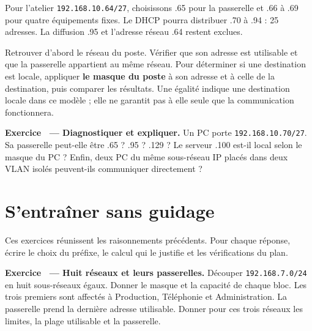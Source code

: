 \documentclass[11pt,a4paper]{article}
\newif\ifcorrige
\newcommand{\ip}[1]{\textcolor{ipred}{\texttt{#1}}}
\newcounter{exo}
\newcommand{\exo}[2]{%
  \Needspace{6cm}\stepcounter{exo}\begin{quest}\textbf{Exercice \theexo\ — #1.} #2\end{quest}}
\newcommand{\zone}[2]{%
  \ifcorrige
    \begin{tcolorbox}[colback=corrbg,colframe=corr,boxrule=0.6pt,arc=1pt,left=5pt,right=5pt,
      fontupper=\small\color{corr}]#2\end{tcolorbox}%
  \else
    \begin{tcolorbox}[colback=white,colframe=black!45,boxrule=0.5pt,arc=1pt,height=#1]\end{tcolorbox}%
  \fi}
\begin{document}
Pour l'atelier \ip{192.168.10.64/27}, choisissons .65 pour la passerelle et .66 à .69 pour quatre
équipements fixes. Le DHCP pourra distribuer .70 à .94 : 25 adresses.
La diffusion .95 et l'adresse réseau .64 restent exclues.

\begin{methode}
Retrouver d'abord le réseau du poste. Vérifier que son adresse est utilisable et que la passerelle
appartient au même réseau. Pour déterminer si une destination est locale, appliquer
\textbf{le masque du poste} à son adresse et à celle de la destination, puis comparer les résultats.
Une égalité indique une destination locale dans ce modèle ; elle ne garantit pas à elle seule
que la communication fonctionnera.
\end{methode}

\exo{Diagnostiquer et expliquer}{Un PC porte \ip{192.168.10.70/27}.
Sa passerelle peut-elle être .65 ? .95 ? .129 ?
Le serveur .100 est-il local selon le masque du PC ?
Enfin, deux PC du même sous-réseau IP placés dans deux VLAN isolés peuvent-ils communiquer directement ?}
\zone{2.8cm}{Le PC appartient à \ip{192.168.10.64/27}, utilisables .65 à .94.
.65 convient si elle est attribuée au routeur ; .95 est la diffusion ; .129 est hors du sous-réseau.
.100 appartient à .96/27 : destination distante pour ce PC.
Deux VLAN isolés ne fournissent pas la connectivité de couche 2 nécessaire, même si les adresses
ont été configurées dans un même sous-réseau IP.}

\Needspace{6cm}
\section{S'entraîner sans guidage}
Ces exercices réunissent les raisonnements précédents. Pour chaque réponse, écrire le choix du préfixe,
le calcul qui le justifie et les vérifications du plan.

\exo{Huit réseaux et leurs passerelles}{Découper \ip{192.168.7.0/24} en huit sous-réseaux égaux.
Donner le masque et la capacité de chaque bloc. Les trois premiers sont affectés à Production,
Téléphonie et Administration. La passerelle prend la dernière adresse utilisable.
Donner pour ces trois réseaux les limites, la plage utilisable et la passerelle.}
\zone{3.2cm}{3 bits supplémentaires donnent 8 réseaux /27, masque \ip{255.255.255.224}, 30 utilisables chacun.
Production : .0/27, utilisables .1 à .30, diffusion .31, passerelle .30.
Téléphonie : .32/27, utilisables .33 à .62, diffusion .63, passerelle .62.
Administration : .64/27, utilisables .65 à .94, diffusion .95, passerelle .94.
Les cinq autres réseaux commencent à .96, .128, .160, .192 et .224.}
\end{document}
